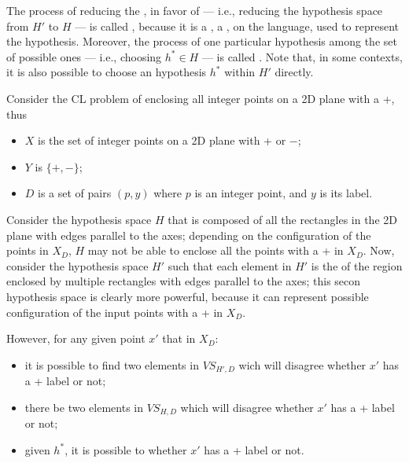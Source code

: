 \documentclass[a4paper, 12pt]{report}
\begin{document}
    The process of reducing the , in favor of  --- i.e., reducing the hypothesis space from $H'$ to $H$ --- is called , because it is a , a , on the language, used to represent the hypothesis. Moreover, the process of  one particular hypothesis among the set of possible ones --- i.e., choosing $h^* \in H$ --- is called . Note that, in some contexts, it is also possible to choose an hypothesis $h^*$ within $H'$ directly.

    \begin{example}
        Consider the CL problem of enclosing all integer points on a 2D plane  with a +, thus

        \begin{itemize}
            \item $X$ is the set of integer points on a 2D plane  with + or $-$;
            \item $Y$ is $\{+,-\}$;
            \item $D$ is a set of pairs $(p, y)$ where $p$ is an integer point, and $y$ is its label.
        \end{itemize}

        Consider the hypothesis space $H$ that is composed of all the rectangles in the 2D plane with edges parallel to the axes; depending on the configuration of the points in $X_D$, $H$ may not be able to enclose all the points with a + in $X_D$. Now, consider the hypothesis space $H'$ such that each element in $H'$ is the  of the region enclosed by multiple rectangles with edges parallel to the axes; this secon hypothesis space is clearly more powerful, because it can represent  possible configuration of the input points with a  + in $X_D$.

        However, for any given point $x'$ that  in $X_D$:

        \begin{itemize}
            \item it is  possible to find two elements in $VS_{H', D}$ wich will disagree whether $x'$ has a + label or not;
            \item there  be two elements in $VS_{H, D}$ which will disagree whether $x'$ has a + label or not;
            \item given $h^*$, it is  possible to  whether $x'$ has a + label or not.
        \end{itemize}
    \end{example}
\end{document}
